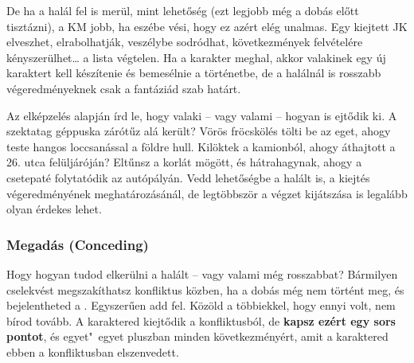 De ha a halál fel is merül, mint lehetőség (ezt legjobb még a dobás előtt tisztázni), a KM jobb, ha eszébe vési, hogy ez azért elég unalmas. Egy kiejtett JK elveszhet, elrabolhatják, veszélybe sodródhat, következmények felvételére kényszerülhet… a lista végtelen. Ha a karakter meghal, akkor valakinek egy új karaktert kell készítenie és bemesélnie a történetbe, de a halálnál is rosszabb végeredményeknek csak a fantáziád szab határt.

Az elképzelés alapján írd le, hogy valaki -- vagy valami -- hogyan is ejtődik ki. A szektatag géppuska zárótűz alá került? Vörös fröcskölés tölti be az eget, ahogy teste hangos loccsanással a földre hull. Kilöktek a kamionból, ahogy áthajtott a 26. utca felüljáróján? Eltűnsz a korlát mögött, és hátrahagynak, ahogy a csetepaté folytatódik az autópályán. Vedd lehetőségbe a halált is, a kiejtés végeredményének meghatározásánál, de legtöbbször a végzet kijátszása is legalább olyan érdekes lehet.

\newpage


\subsubsection[Megadás]{Megadás (Conceding)}

Hogy hogyan tudod elkerülni a halált -- vagy valami még rosszabbat? Bármilyen cselekvést megszakíthatsz konfliktus közben, ha a dobás még nem történt meg, és bejelentheted a . Egyszerűen add fel. Közöld a többiekkel, hogy ennyi volt, nem bírod tovább. A karaktered kiejtődik a konfliktusból, de \textbf{kapsz ezért egy sors pontot}, és egyet"~egyet pluszban minden következményért, amit a karaktered ebben a konfliktusban elszenvedett.


